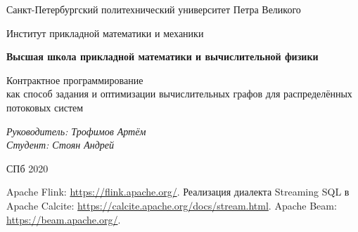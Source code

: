\documentclass[a4paper,12pt]{article}
\begin{document}
\thispagestyle{empty}
\begin{center}
    Санкт-Петербургский политехнический университет Петра Великого

    Институт прикладной математики и механики

    \textbf{Высшая школа прикладной математики и вычислительной
    физики}
\end{center}
\vspace{13ex}

\begin{center}
    \vspace{16ex}
    \begin{spacing}{1.5}
        {\Large Контрактное программирование \\как способ задания и оптимизации вычислительных графов для распределённых потоковых систем}
    \end{spacing}
\end{center}
\vfill
\begin{flushright}
    \noindent
    \textit{Руководитель: Трофимов Артём} \\
    \textit{Студент: Стоян Андрей}
\end{flushright}
\vspace{5ex}
\begin{center}
    СПб 2020
\end{center}
\newpage

\tableofcontents
\newpage


\newpage

\newpage

\newpage








\begin{thebibliography}{9}  %
     Apache Flink: \url{https://flink.apache.org/}.
     Реализация диалекта Streaming SQL в Apache Calcite: \url{https://calcite.apache.org/docs/stream.html}.
     Apache Beam: \url{https://beam.apache.org/}.
\end{thebibliography}
\end{document}

